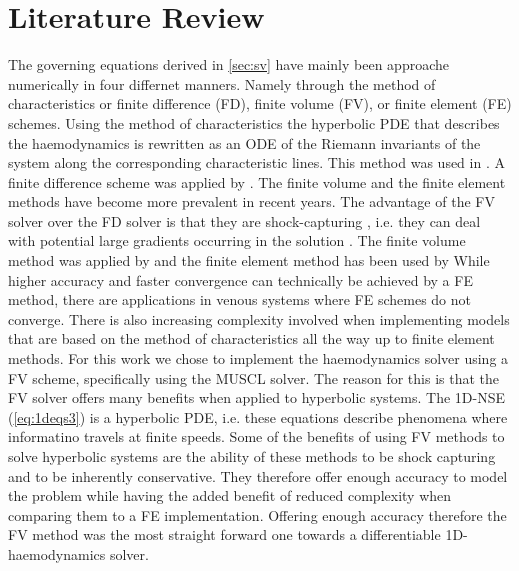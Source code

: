 \documentclass[a4paper, oneside]{discothesis}
\begin{document}
\section{Literature Review} \label{sec:lr}
The governing equations derived in \autoref{sec:sv} have mainly been approache numerically in four differnet manners.
Namely through the method of characteristics or finite difference (FD), finite volume (FV), or finite element (FE) schemes.
Using the method of characteristics the hyperbolic PDE that describes the haemodynamics is rewritten as an ODE of the Riemann invariants of the system along the corresponding characteristic lines.
This method was used in \cite{streeter1963pulsatile,bodley1971non,parker1990forward,wang2004wave,wang2003time}.
A finite difference scheme was applied by \cite{smith2002anatomically,elad1991numerical,elad1991numerical,pontrelli2003numerical,reymond2009validation}.
The finite volume and the finite element methods have become more prevalent in recent years.
The advantage of the FV solver over the FD solver is that they are shock-capturing \cite{toro2001shock}, i.e. they can deal with potential large gradients occurring in the solution \cite{shu1988efficient,harten1997uniformly}.
The finite volume method was applied by \cite{melis2017gaussian,brook1999numerical,brook2002model} and the finite element method has been used by \cite{sherwin2003one,sherwin2003computational,formaggia2001coupling,wan2002one,porenta1986finite,rooz1982finite,bessems2008experimental}
While higher accuracy and faster convergence can technically be achieved by a FE method, there are applications in venous systems where FE schemes do not converge.
There is also increasing complexity involved when implementing models that are based on the method of characteristics all the way up to finite element methods.
For this work we chose to implement the haemodynamics solver using a FV scheme, specifically using the MUSCL solver.
The reason for this is that the FV solver offers many benefits when applied to hyperbolic systems.
The 1D-NSE (\autoref{eq:1deqs3}) is a hyperbolic PDE, i.e. these equations describe phenomena where informatino travels at finite speeds. 
Some of the benefits of using FV methods to solve hyperbolic systems are the ability of these methods to be shock capturing and to be inherently conservative.
They therefore offer enough accuracy to model the problem while having the added benefit of reduced complexity when comparing them to a FE implementation.
Offering enough accuracy therefore the FV method was the most straight forward one towards a differentiable 1D-haemodynamics solver.
\end{document}
